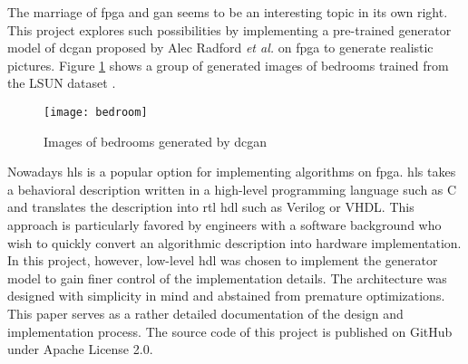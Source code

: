 The marriage of \gls{fpga} and \gls{gan} seems to be an interesting topic in its own right. This project
explores such possibilities by implementing a pre-trained generator model of \gls{dcgan} proposed by
Alec Radford \textit{et al.} \cite{radford:conv_gan} on \gls{fpga} to generate realistic pictures.
Figure \ref{fig:bedroom} shows a group of generated images of bedrooms trained from the LSUN dataset
\cite{yu15lsun}.

\begin{figure}[h]
  \centering
  \texttt{[image: bedroom]}
  \caption{Images of bedrooms generated by \gls{dcgan} \cite{radford:conv_gan}}
  \label{fig:bedroom}
\end{figure}

Nowadays \gls{hls} is a popular option for implementing algorithms on \gls{fpga}. \gls{hls} takes a
behavioral description written in a high-level programming language such as C and translates the description
into \gls{rtl} \gls{hdl} such as Verilog or VHDL. This approach is particularly favored by engineers with
a software background who wish to quickly convert an algorithmic description into hardware implementation.
In this project, however, low-level \gls{hdl} was chosen to implement the generator model to gain finer
control of the implementation details. The architecture was designed with simplicity in mind and abstained
from premature optimizations. This paper serves as a rather detailed documentation of the design and
implementation process. The source code of this project is published on GitHub \cite{github:dcgan_fpga} under
Apache License 2.0.

\clearpage %
